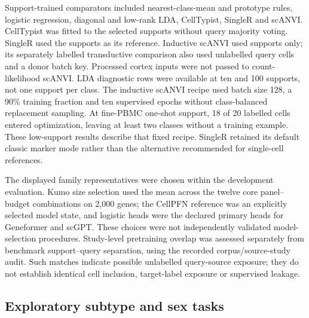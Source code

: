 Support-trained comparators included nearest-class-mean and prototype rules, logistic regression, diagonal and low-rank LDA, CellTypist\cite{dominguezconde2022celltypist}, SingleR\cite{aran2019singler} and scANVI\cite{xu2021scanvi}. CellTypist was fitted to the selected supports without query majority voting. SingleR used the supports as its reference. Inductive scANVI used supports only; its separately labelled transductive comparison also used unlabelled query cells and a donor batch key. Processed cortex inputs were not passed to count-likelihood scANVI. LDA diagnostic rows were available at ten and 100 supports, not one support per class. The inductive scANVI recipe used batch size 128, a 90\% training fraction and ten supervised epochs without class-balanced replacement sampling. At fine-PBMC one-shot support, 18 of 20 labelled cells entered optimization, leaving at least two classes without a training example. These low-support results describe that fixed recipe. SingleR retained its default classic marker mode rather than the alternative recommended for single-cell references.

The displayed family representatives were chosen within the development evaluation. Kumo size selection used the mean across the twelve core panel--budget combinations on 2,000 genes; the CellPFN reference was an explicitly selected model state, and logistic heads were the declared primary heads for Geneformer and scGPT. These choices were not independently validated model-selection procedures. Study-level pretraining overlap was assessed separately from benchmark support--query separation, using the recorded corpus/source-study audit. Such matches indicate possible unlabelled query-source exposure; they do not establish identical cell inclusion, target-label exposure or supervised leakage.

\subsection*{Exploratory subtype and sex tasks}

